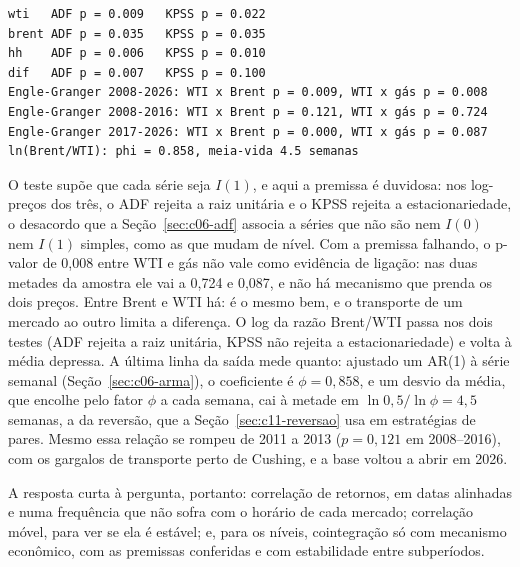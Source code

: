 
\begin{lstlisting}[style=saida]
wti   ADF p = 0.009   KPSS p = 0.022
brent ADF p = 0.035   KPSS p = 0.035
hh    ADF p = 0.006   KPSS p = 0.010
dif   ADF p = 0.007   KPSS p = 0.100
Engle-Granger 2008-2026: WTI x Brent p = 0.009, WTI x gás p = 0.008
Engle-Granger 2008-2016: WTI x Brent p = 0.121, WTI x gás p = 0.724
Engle-Granger 2017-2026: WTI x Brent p = 0.000, WTI x gás p = 0.087
ln(Brent/WTI): phi = 0.858, meia-vida 4.5 semanas
\end{lstlisting}

O teste supõe que cada série seja $I(1)$, e aqui a premissa é duvidosa: nos log-preços dos três, o ADF rejeita a raiz unitária e o KPSS rejeita a estacionariedade, o desacordo que a Seção~\ref{sec:c06-adf} associa a séries que não são nem $I(0)$ nem $I(1)$ simples, como as que mudam de nível. Com a premissa falhando, o p-valor de 0,008 entre WTI e gás não vale como evidência de ligação: nas duas metades da amostra ele vai a 0,724 e 0,087, e não há mecanismo que prenda os dois preços. Entre Brent e WTI há: é o mesmo bem, e o transporte de um mercado ao outro limita a diferença. O log da razão Brent/WTI passa nos dois testes (ADF rejeita a raiz unitária, KPSS não rejeita a estacionariedade) e volta à média depressa. A última linha da saída mede quanto: ajustado um AR(1) à série semanal (Seção~\ref{sec:c06-arma}), o coeficiente é $\phi = 0,858$, e um desvio da média, que encolhe pelo fator $\phi$ a cada semana, cai à metade em $\ln 0,5/\ln\phi = 4,5$ semanas, a  da reversão, que a Seção~\ref{sec:c11-reversao} usa em estratégias de pares. Mesmo essa relação se rompeu de 2011 a 2013 ($p = 0,121$ em 2008--2016), com os gargalos de transporte perto de Cushing, e a base voltou a abrir em 2026.

A resposta curta à pergunta, portanto: correlação de retornos, em datas alinhadas e numa frequência que não sofra com o horário de cada mercado; correlação móvel, para ver se ela é estável; e, para os níveis, cointegração só com mecanismo econômico, com as premissas conferidas e com estabilidade entre subperíodos.

